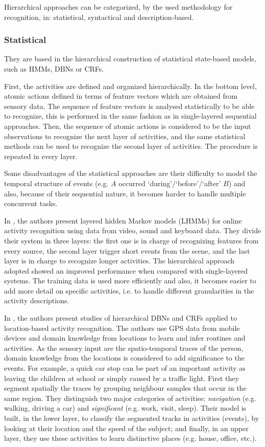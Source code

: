 Hierarchical approaches can be categorized, by the used methodology for recognition, in: statistical, syntactical and description-based. %


\subsubsection{Statistical}
They are based in the hierarchical construction of statistical state-based models, such as HMMs, DBNs or CRFs.

First, the activities are defined and organized hierarchically.
In the bottom level, atomic actions defined in terms of feature vectors which are obtained from sensory data.
The sequence of feature vectors is analysed statistically to be able to recognize, this is performed in the same fashion as in single-layered sequential approaches. 
Then, the sequence of atomic actions is considered to be the input observations to recognize the next layer of activities, and the same statistical methods can be used to recognize the second layer of activities.
The procedure is repeated in every layer.

Some disadvantages of the statistical approaches are their difficulty to model the temporal structure of events (e.g. $A$ occurred `during'/`before'/`after' $B$) and also, because of their sequential nature, it becomes harder to handle multiple concurrent tasks.

In \citep{Oliver2002_LayRepHumActRec}, the authors present layered hidden Markov models (LHMMs) for online activity recognition using data from video, sound and keyboard data. 
They divide their system in three layers: the first one is in charge of recognizing features from every source, the second layer trigger short events from the scene, and the last layer is in charge to recognize longer activities. 
The hierarchical approach adopted showed an improved performance when compared with single-layered systems.
The training data is used more efficiently and also, it becomes easier to add more detail on specific activities, i.e. to handle different granularities in the activity descriptions.

In \citep{Liao2007_LIT,Liao2007_HCRFGPSAR}, the authors present studies of hierarchical DBNs and CRFs applied to location-based activity recognition.
The authors use GPS data from mobile devices and domain knowledge from locations to learn and infer routines and activities.
As the sensory input are the spatio-temporal traces of the person, domain knowledge from the locations is considered to add significance to the events. 
For example, a quick car stop can be part of an important activity as leaving the children at school or simply caused by a traffic light.
First they segment spatially the traces by grouping neighbour samples that occur in the same region.
They distinguish two major categories of activities: \textit{navigation} (e.g. walking, driving a car) and \textit{significant} (e.g. work, visit, sleep).
Their model is built, in the lower layer, to classify the segmented tracks in activities (events), by looking at their location and the speed of the subject; and finally, in an upper layer, they use these activities to learn distinctive places (e.g. house, office, etc.).


